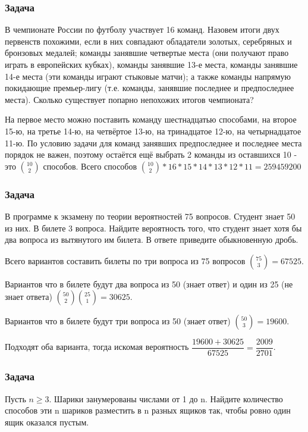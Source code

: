 \documentclass[a4paper,12pt]{article}
\begin{document}
\subsubsection*{Задача}
В чемпионате России по футболу участвует 16 команд. Назовем итоги двух первенств похожими, если в них совпадают обладатели золотых, серебряных и бронзовых медалей; команды занявшие четвертые места (они получают право играть в европейских кубках), команды занявшие 13-е места, команды занявшие 14-е места (эти команды играют стыковые матчи); а также команды напрямую покидающие премьер-лигу (т.е. команды, занявшие последнее и предпоследнее места). Сколько существует попарно непохожих итогов чемпионата?

На первое место можно поставить команду шестнадцатью способами, на второе 15-ю, на третье 14-ю, на четвёртое 13-ю, на тринадцатое 12-ю, на четырнадцатое 11-ю. По условию задачи для команд занявших предпоследнее и последнее места порядок не важен, поэтому остаётся ещё выбрать 2 команды из оставшихся 10 - это \(\binom{10}{2}\) способов. Всего способов  \(\binom{10}{2}*16*15*14*13*12*11=259459200\)

\subsubsection*{Задача}
В программе к экзамену по теории вероятностей 75 вопросов. Студент знает 50 из них. В билете 3 вопроса. Найдите вероятность того, что студент знает хотя бы два вопроса из вытянутого им билета. В ответе приведите обыкновенную дробь.

Всего вариантов составить билеты по три вопроса из 75 вопросов \(\binom{75}{3}=67525\).

Вариантов что в билете будут два вопроса из 50 (знает ответ) и один из 25 (не знает ответа) \(\binom{50}{2}\binom{25}{1}=30625\).

Вариантов что в билете будут три вопроса из 50 (знает ответ)  \(\binom{50}{3}=19600\).

Подходят оба варианта, тогда искомая вероятность \(\dfrac{19600+30625}{67525}=\dfrac{2009}{2701}\).


\subsubsection*{Задача}
Пусть \(n \geqslant 3\). Шарики занумерованы числами от 1 до n. Найдите количество способов эти n шариков разместить в n разных ящиков так, чтобы ровно один ящик оказался пустым.
\end{document}
